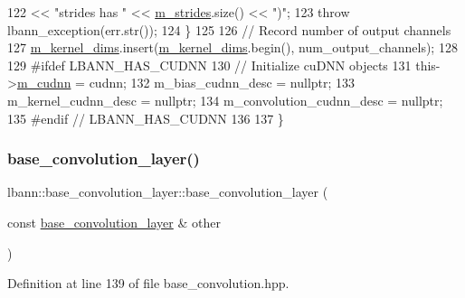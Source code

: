 \begin{DoxyCode}
122           << \textcolor{stringliteral}{"strides has "} << \hyperlink{classlbann_1_1base__convolution__layer_a2429495822363e41f1f6b96a6b430445}{m\_strides}.size() << \textcolor{stringliteral}{")"};
123       \textcolor{keywordflow}{throw} lbann\_exception(err.str());
124     \}
125 
126     \textcolor{comment}{// Record number of output channels}
127     \hyperlink{classlbann_1_1base__convolution__layer_a283edb6a476f975e713d0b4235ac658f}{m\_kernel\_dims}.insert(\hyperlink{classlbann_1_1base__convolution__layer_a283edb6a476f975e713d0b4235ac658f}{m\_kernel\_dims}.begin(), num\_output\_channels);
128 
129 \textcolor{preprocessor}{  #ifdef LBANN\_HAS\_CUDNN}
130     \textcolor{comment}{// Initialize cuDNN objects}
131     this->\hyperlink{classlbann_1_1Layer_a08dbb94239e3b8c96329786c57c72e21}{m\_cudnn} = cudnn;
132     m\_bias\_cudnn\_desc = \textcolor{keyword}{nullptr};
133     m\_kernel\_cudnn\_desc = \textcolor{keyword}{nullptr};
134     m\_convolution\_cudnn\_desc = \textcolor{keyword}{nullptr};
135 \textcolor{preprocessor}{  #endif // LBANN\_HAS\_CUDNN}
136 
137   \}
\end{DoxyCode}
\mbox{\label{classlbann_1_1base__convolution__layer_a5ffba3070c459e3fc1dc1a5ecdaf5e0c}} 
\subsubsection{\texorpdfstring{base\+\_\+convolution\+\_\+layer()}{base\_convolution\_layer()}\hspace{0.1cm}{\footnotesize\ttfamily [2/2]}}
{\footnotesize\ttfamily lbann\+::base\+\_\+convolution\+\_\+layer\+::base\+\_\+convolution\+\_\+layer (\begin{DoxyParamCaption}\item[{const \hyperlink{classlbann_1_1base__convolution__layer}{base\+\_\+convolution\+\_\+layer} \&}]{other }\end{DoxyParamCaption})\hspace{0.3cm}{\ttfamily [inline]}}



Definition at line 139 of file base\+\_\+convolution.\+hpp.


